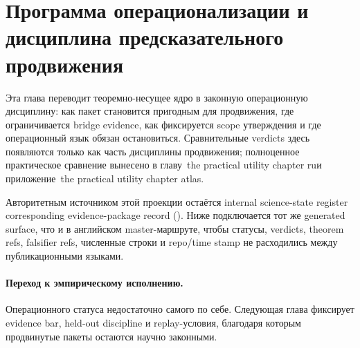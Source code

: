 \section{Программа операционализации и дисциплина предсказательного продвижения}
\label{sec:oc-core-1-3-operationalization-program-ru}

Эта глава переводит теоремно-несущее ядро в законную операционную дисциплину:
как пакет становится пригодным для продвижения, где ограничивается bridge
evidence, как фиксируется scope утверждения и где операционный язык обязан
остановиться. Сравнительные verdicts здесь появляются только как часть
дисциплины продвижения; полноценное практическое сравнение вынесено в
главу~the practical utility chapter ruи
приложение~the practical utility chapter atlas.

Авторитетным источником этой проекции остаётся internal science-state register
corresponding evidence-package record
(). Ниже подключается тот же generated
surface, что и в английском master-маршруте, чтобы статусы, verdicts, theorem
refs, falsifier refs, численные строки и repo/time stamp не расходились между
публикационными языками.

\begingroup
\small

\endgroup

\paragraph{Переход к эмпирическому исполнению.}
Операционного статуса недостаточно самого по себе. Следующая глава фиксирует
evidence bar, held-out discipline и replay-условия, благодаря которым
продвинутые пакеты остаются научно законными.
